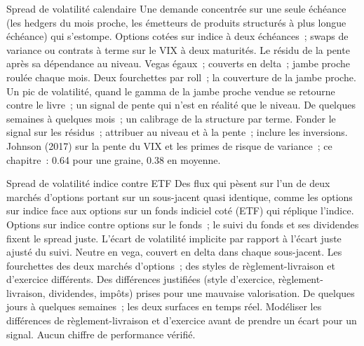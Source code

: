 \begin{strategyfile}{Spread de volatilité calendaire}\label{strat:s2:skew-and-term-structure-relative-value:calendar}
 Une demande concentrée sur une seule échéance (les hedgers du mois proche, les émetteurs de produits structurés à plus longue échéance) qui s'estompe.
 Options cotées sur indice à deux échéances~; swaps de variance ou contrats à terme sur le VIX à deux maturités.
 Le résidu de la pente après sa dépendance au niveau.
 Vegas égaux~; couverts en delta~; jambe proche roulée chaque mois.
 Deux fourchettes par roll~; la couverture de la jambe proche.
 Un pic de volatilité, quand le gamma de la jambe proche vendue se retourne contre le livre~; un signal de pente qui n'est en réalité que le niveau.
 De quelques semaines à quelques mois~; un calibrage de la structure par terme.
 Fonder le signal sur les résidus~; attribuer au niveau et à la pente~; inclure les inversions.
 Johnson (2017) sur la pente du VIX et les primes de risque de variance~; ce chapitre~: 0.64 pour une graine, 0.38 en moyenne.
\end{strategyfile}

\begin{strategyfile}{Spread de volatilité indice contre ETF}\label{strat:s2:skew-and-term-structure-relative-value:etf}
 Des flux qui pèsent sur l'un de deux marchés d'options portant sur un sous-jacent quasi identique, comme les options sur indice face aux options sur un
fonds indiciel coté (ETF) qui réplique l'indice.
 Options sur indice contre options sur le fonds~; le suivi du fonds et ses dividendes fixent le spread juste.
 L'écart de volatilité implicite par rapport à l'écart juste ajusté du suivi.
 Neutre en vega, couvert en delta dans chaque sous-jacent.
 Les fourchettes des deux marchés d'options~; des styles de règlement-livraison et d'exercice différents.
 Des différences justifiées (style d'exercice, règlement-livraison, dividendes, impôts) prises pour une mauvaise valorisation.
 De quelques jours à quelques semaines~; les deux surfaces en temps réel.
 Modéliser les différences de règlement-livraison et d'exercice avant de prendre un écart pour un signal.
 Aucun chiffre de performance vérifié.
\end{strategyfile}

